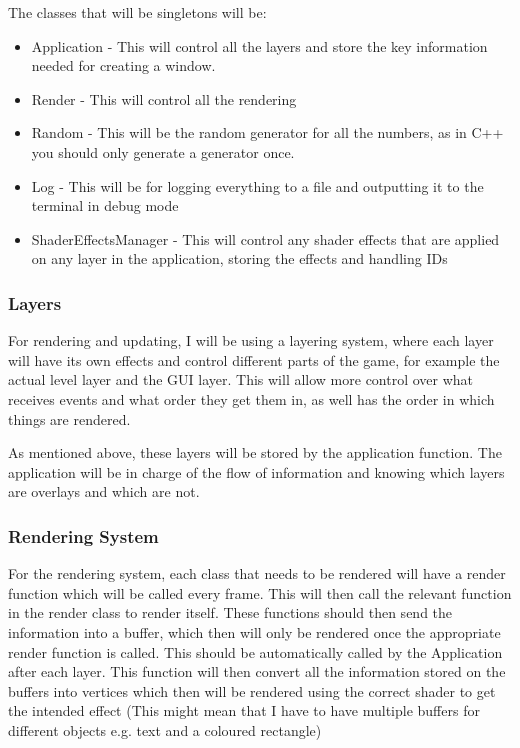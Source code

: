 \documentclass{article}
\begin{document}
                The classes that will be singletons will be:
                \begin{itemize}
                    \item Application - This will control all the layers and store the key information needed for creating a window.
                    \item Render - This will control all the rendering
                    \item Random - This will be the random generator for all the numbers, as in C++ you should only generate a generator once.
                    \item Log - This will be for logging everything to a file and outputting it to the terminal in debug mode
                    \item ShaderEffectsManager - This will control any shader effects that are applied on any layer in the application, storing the effects and handling IDs
                \end{itemize}
            \subsubsection{Layers}
                For rendering and updating, I will be using a layering system, where each layer will have its own effects and control different parts of the game, for example the actual level layer and the GUI layer. This will allow more control over what receives events and what order they get them in, as well has the order in which things are rendered.

                As mentioned above, these layers will be stored by the application function. The application will be in charge of the flow of information and knowing which layers are overlays and which are not.
            \subsubsection{Rendering System}
                For the rendering system, each class that needs to be rendered will have a render function which will be called every frame. This will then call the relevant function in the render class to render itself. These functions should then send the information into a buffer, which then will only be rendered once the appropriate render function is called. This should be automatically called by the Application after each layer. This function will then convert all the information stored on the buffers into vertices which then will be rendered using the correct shader to get the intended effect (This might mean that I have to have multiple buffers for different objects e.g. text and a coloured rectangle)
\end{document}
